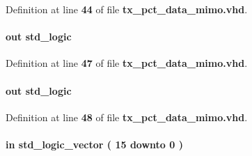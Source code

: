 Definition at line {\bf 44} of file {\bf tx\+\_\+pct\+\_\+data\+\_\+mimo.\+vhd}.

\paragraph[{error\+\_\+out}]{ {\bfseries \textcolor{keywordflow}{out}\textcolor{vhdlchar}{ }} {\bfseries \textcolor{comment}{std\+\_\+logic}\textcolor{vhdlchar}{ }} \hspace{0.3cm}{\ttfamily [Port]}}\label{classtx__pct__data__mimo_a7d3323a10c64f9e722f7b8e5e5a7ad6a}


Definition at line {\bf 47} of file {\bf tx\+\_\+pct\+\_\+data\+\_\+mimo.\+vhd}.

\paragraph[{error\+\_\+out\+\_\+fx3}]{ {\bfseries \textcolor{keywordflow}{out}\textcolor{vhdlchar}{ }} {\bfseries \textcolor{comment}{std\+\_\+logic}\textcolor{vhdlchar}{ }} \hspace{0.3cm}{\ttfamily [Port]}}\label{classtx__pct__data__mimo_ac7dca2cb975cdeda5358624530b2f52f}


Definition at line {\bf 48} of file {\bf tx\+\_\+pct\+\_\+data\+\_\+mimo.\+vhd}.

\paragraph[{fifo\+\_\+data}]{ {\bfseries \textcolor{keywordflow}{in}\textcolor{vhdlchar}{ }} {\bfseries \textcolor{comment}{std\+\_\+logic\+\_\+vector}\textcolor{vhdlchar}{ }\textcolor{vhdlchar}{(}\textcolor{vhdlchar}{ }\textcolor{vhdlchar}{ } \textcolor{vhdldigit}{15} \textcolor{vhdlchar}{ }\textcolor{keywordflow}{downto}\textcolor{vhdlchar}{ }\textcolor{vhdlchar}{ } \textcolor{vhdldigit}{0} \textcolor{vhdlchar}{ }\textcolor{vhdlchar}{)}\textcolor{vhdlchar}{ }} \hspace{0.3cm}{\ttfamily [Port]}}\label{classtx__pct__data__mimo_a586c492edcaab3aef890be12a0049714}


